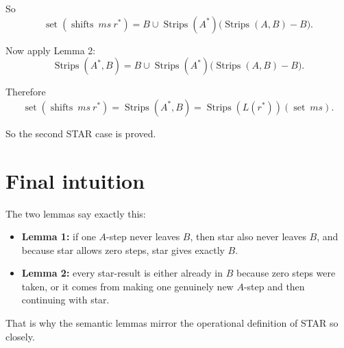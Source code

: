 \documentclass[11pt]{article}
\begin{document}
So
\[
\operatorname{set}(\operatorname{shifts}\ ms\ r^*)
=
B \cup \operatorname{Strips}(A^*)\bigl(\operatorname{Strips}(A,B)-B\bigr).
\]

Now apply Lemma 2:
\[
\operatorname{Strips}(A^*,B)
=
B \cup \operatorname{Strips}(A^*)\bigl(\operatorname{Strips}(A,B)-B\bigr).
\]

Therefore
\[
\operatorname{set}(\operatorname{shifts}\ ms\ r^*)
=
\operatorname{Strips}(A^*,B)
=
\operatorname{Strips}(L(r^*))(\operatorname{set}\ ms).
\]

So the second STAR case is proved.

\section*{Final intuition}

The two lemmas say exactly this:

\begin{itemize}
\item \textbf{Lemma 1:} if one \(A\)-step never leaves \(B\), then star also never leaves \(B\), and because star allows zero steps, star gives exactly \(B\).
\item \textbf{Lemma 2:} every star-result is either already in \(B\) because zero steps were taken, or it comes from making one genuinely new \(A\)-step and then continuing with star.
\end{itemize}

That is why the semantic lemmas mirror the operational definition of STAR so closely.
\end{document}
